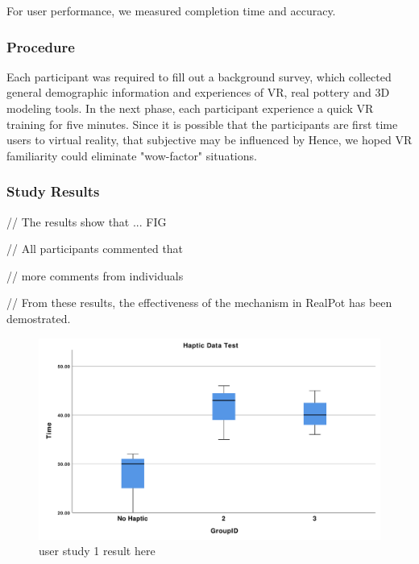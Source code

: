For user performance, we measured completion time and accuracy.

\subsubsection{Procedure}
Each participant was required to fill out a background survey, which collected general demographic information and experiences of VR, real pottery and 3D modeling tools.
In the next phase, each participant experience a quick VR training for five minutes.
Since it is possible that the participants are first time users to virtual reality, that subjective may be influenced by 
Hence, we hoped VR familiarity could eliminate "wow-factor" situations.
%


\subsubsection{Study Results}

// The results show that ... FIG

// All participants commented that

// more comments from individuals


// From these results, the effectiveness of the mechanism in RealPot has been demostrated.

\begin{figure}
	\includegraphics[width=\textwidth]{haptic_time.pdf}
	\caption{user study 1 result here}
	\label{fig:u1r}
\end{figure}



